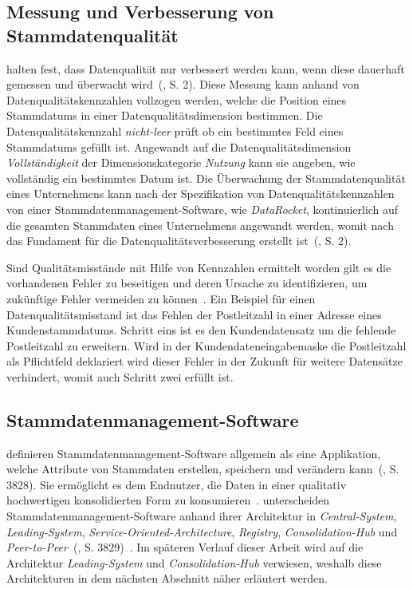 \documentclass[
  language=german, %
  type=bachelor,%
  ngerman
]{isthesis}
\begin{document}
\begin{content}
	\subsection{Messung und Verbesserung von Stammdatenqualität}
	\textsc{\citeauthor{baghi2013controlling}} halten fest, dass Datenqualität
	nur verbessert werden kann, wenn diese dauerhaft gemessen und überwacht
	wird~(\citeyear{baghi2013controlling}, S. 2). Diese Messung kann anhand von
	Datenqualitätskennzahlen vollzogen werden, welche die Position eines
	Stammdatums in einer Datenqualitätsdimension bestimmen. Die
	Datenqualitätskennzahl \textit{nicht-leer} prüft \zB{} ob ein bestimmtes Feld
	eines Stammdatums gefüllt ist. Angewandt auf die Datenqualitätsdimension
	\textit{Vollständigkeit} der Dimensionskategorie \textit{Nutzung} kann sie
	angeben, wie vollständig ein bestimmtes Datum ist. Die Überwachung der
	Stammdatenqualität eines Unternehmens kann nach der Spezifikation von
	Datenqualitätskennzahlen von einer Stammdatenmanagement-Software, wie \zB{}
	\textit{DataRocket}, kontinuierlich auf die gesamten Stammdaten eines
	Unternehmens angewandt werden, womit nach
	\textsc{\citeauthor{baghi2013controlling}} das Fundament für die
	Datenqualitätsverbesserung erstellt ist~(\citeyear{baghi2013controlling}, S.
	2).

	Sind Qualitätsmisstände mit Hilfe von Kennzahlen ermittelt worden gilt es die
	vorhandenen Fehler zu beseitigen und deren Ursache zu identifizieren, um
	zukünftige Fehler vermeiden zu können~\cite[][S. 22]{eckerson2002data}. Ein
	Beispiel für einen Datenqualitätsmisstand ist das Fehlen der Postleitzahl in
	einer Adresse eines Kundenstammdatums. Schritt eins ist es den
	Kundendatensatz um die fehlende Postleitzahl zu erweitern. Wird in der
	Kundendateneingabemaske die Postleitzahl als Pflichtfeld deklariert wird
	dieser Fehler in der Zukunft für weitere Datensätze verhindert, womit auch
	Schritt zwei erfüllt ist.


  \subsection{Stammdatenmanagement-Software}

  \textsc{\citeauthor{baghi2014toward}} definieren
  Stammdatenmanagement-Software allgemein als eine Applikation, welche
  Attribute von Stammdaten erstellen, speichern und verändern
  kann~(\citeyear{baghi2014toward}, S. 3828).  Sie ermöglicht es dem Endnutzer, die Daten in einer
  qualitativ hochwertigen konsolidierten Form zu konsumieren~\cite[][Abschnitt
  1.2.]{dreibelbis2008enterprise}.  \textsc{\citeauthor{baghi2014toward}}
  unterscheiden Stammdatenmanagement-Software anhand ihrer Architektur in
  \textit{Central-System}, \textit{Leading-System},
  \textit{Service-Oriented-Architecture}, \textit{Registry},
  \textit{Consolidation-Hub} und
  \textit{Peer-to-Peer}~(\citeyear{baghi2014toward}, S. 3829)~\cite[][Abschnitt
  5.3.1.]{dreibelbis2008enterprise}. Im späteren Verlauf dieser Arbeit wird auf
  die Architektur \textit{Leading-System} und \textit{Consolidation-Hub}
  verwiesen, weshalb diese Architekturen in dem nächsten Abschnitt näher
  erläutert werden.


\end{content}
\end{document}
